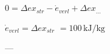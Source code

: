 \( 0 = \Delta ex_{str} - \dot{e}_{verl} + \Delta ex_{...} \)  

\( \dot{e}_{verl} = \Delta ex_{str} \)  
\( = 100 \, \text{kJ/kg} \)  

---